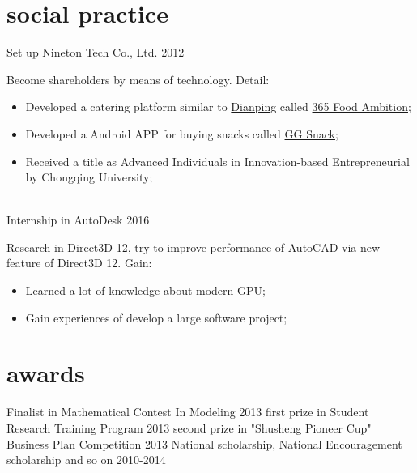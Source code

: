 \documentclass[print]{friggeri-cv} %
\begin{document}
\section{social practice}
\begin{entrylist}
\entryact
{Set up \href{http://nineton.cn/}{Nineton Tech Co., Ltd.}}
{2012}
{Become shareholders by means of technology. Detail:
\begin{itemize}
    \item Developed a catering platform similar to \href{https://www.dianping.com/}{Dianping} called \href{http://www.yqdown.com/shoujiruanjian/bianjieshenghuo/67959.htm}{365 Food Ambition};
    \item Developed a Android APP for buying snacks called \href{http://apk.gfan.com/Product/App584080.html}{GG Snack};
    \item Received a title as Advanced Individuals in Innovation-based Entrepreneurial by Chongqing University;
\end{itemize}
}
\\
\entryact
{Internship in AutoDesk}
{2016}
{Research in Direct3D 12, try to improve performance of AutoCAD via new feature of Direct3D 12. Gain:
\begin{itemize}
    \item Learned a lot of knowledge about modern GPU;
    \item Gain experiences of develop a large software project;
\end{itemize}
}
\end{entrylist}

\section{awards}

\begin{entrylist}
\entryac
{Finalist in Mathematical Contest In Modeling}
{2013}
\entryac
{first prize in Student Research Training Program}
{2013}
\entryac
{second prize in "Shusheng Pioneer Cup" Business Plan Competition}
{2013}
\entryac
{National scholarship, National Encouragement scholarship and so on}
{2010-2014}
\end{entrylist}
\end{document}
